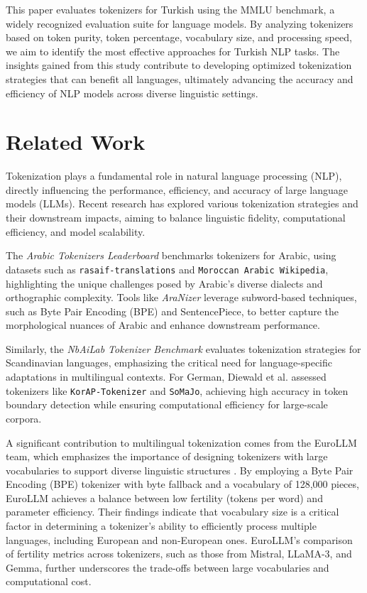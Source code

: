 \documentclass{article}
\begin{document}
  This paper evaluates tokenizers for Turkish using the MMLU benchmark, a widely recognized evaluation suite for language models. By analyzing tokenizers based on token purity, token percentage, vocabulary size, and processing speed, we aim to identify the most effective approaches for Turkish NLP tasks. The insights gained from this study contribute to developing optimized tokenization strategies that can benefit all languages, ultimately advancing the accuracy and efficiency of NLP models across diverse linguistic settings.
  \section{Related Work}

  Tokenization plays a fundamental role in natural language processing (NLP), directly influencing the performance, efficiency, and accuracy of large language models (LLMs). Recent research has explored various tokenization strategies and their downstream impacts, aiming to balance linguistic fidelity, computational efficiency, and model scalability.
  
  The \textit{Arabic Tokenizers Leaderboard} \cite{rashad_arabic_nodate} benchmarks tokenizers for Arabic, using datasets such as \texttt{rasaif-translations} and \texttt{Moroccan Arabic Wikipedia}, highlighting the unique challenges posed by Arabic's diverse dialects and orthographic complexity. Tools like \textit{AraNizer} \cite{koubaa_githubcomriotu-labaranizer_2024} leverage subword-based techniques, such as Byte Pair Encoding (BPE) and SentencePiece, to better capture the morphological nuances of Arabic and enhance downstream performance.
  
  Similarly, the \textit{NbAiLab Tokenizer Benchmark} \cite{rosa_nbailabtokenizer-benchmark_2024} evaluates tokenization strategies for Scandinavian languages, emphasizing the critical need for language-specific adaptations in multilingual contexts. For German, Diewald et al. \cite{diewald_tokenizing_2022} assessed tokenizers like \texttt{KorAP-Tokenizer} and \texttt{SoMaJo}, achieving high accuracy in token boundary detection while ensuring computational efficiency for large-scale corpora.
  
  A significant contribution to multilingual tokenization comes from the EuroLLM team, which emphasizes the importance of designing tokenizers with large vocabularies to support diverse linguistic structures \cite{martins_eurollm_2024}. By employing a Byte Pair Encoding (BPE) tokenizer with byte fallback and a vocabulary of 128,000 pieces, EuroLLM achieves a balance between low fertility (tokens per word) and parameter efficiency. Their findings indicate that vocabulary size is a critical factor in determining a tokenizer’s ability to efficiently process multiple languages, including European and non-European ones. EuroLLM's comparison of fertility metrics across tokenizers, such as those from Mistral, LLaMA-3, and Gemma, further underscores the trade-offs between large vocabularies and computational cost.
  
\end{document}
